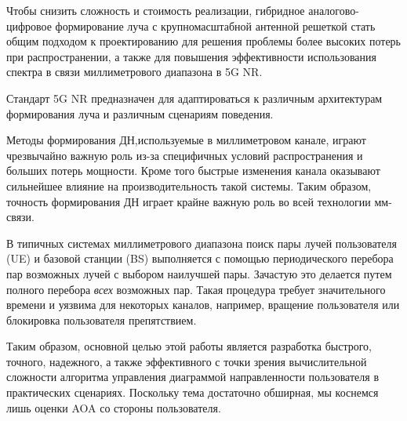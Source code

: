 Чтобы снизить сложность и стоимость реализации, гибридное аналогово-цифровое формирование луча с крупномасштабной антенной решеткой
стать общим подходом к проектированию для решения проблемы более высоких потерь при распространении, а также для повышения эффективности использования спектра в связи миллиметрового диапазона в 5G NR.

Стандарт 5G NR предназначен для адаптироваться к различным архитектурам
формирования луча и различным сценариям поведения.

Методы формирования ДН,используемые в миллиметровом канале, играют чрезвычайно
важную роль из-за специфичных условий распространения и больших потерь
мощности.  Кроме того быстрые изменения канала оказывают сильнейшее влияние на
производительность
такой системы.
Таким образом, точность формирования ДН играет крайне важную роль во всей
технологии мм-связи. 

В типичных системах миллиметрового диапазона поиск пары лучей пользователя (UE) и
базовой станции (BS)
выполняется с помощью периодического перебора пар возможных лучей с выбором
наилучшей пары. Зачастую это делается путем полного перебора \textit{всех}
возможных пар.  Такая процедура требует значительного времени и уязвима для
некоторых каналов, например, вращение пользователя или блокировка пользователя
препятствием. 

Таким образом, основной целью этой работы является разработка быстрого,
точного, надежного, а также эффективного с точки зрения вычислительной сложности алгоритма управления диаграммой направленности
пользователя в практических
сценариях. Поскольку тема достаточно обширная, мы коснемся лишь оценки AOA со
стороны пользователя.
